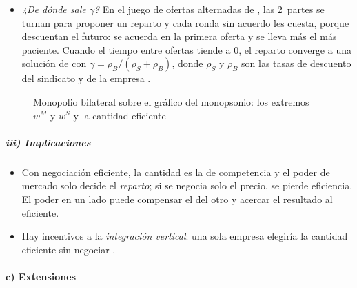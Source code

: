 \documentclass[11pt]{article}
\begin{document}
\begin{itemize}
\begin{equation}
  \end{equation}
  La cantidad es la eficiente y \emph{no depende} de $\gamma$; el salario reparte el excedente: cada parte recibe lo que tendría sin acuerdo más su cuota del excedente neto.
\item \emph{¿De dónde sale $\gamma$?} En el juego de ofertas alternadas de \textcite{Rubinstein1982Perfect}, las 2~partes se turnan para proponer un reparto y cada ronda sin acuerdo les cuesta, porque descuentan el futuro: se acuerda en la primera oferta y se lleva más el más paciente. Cuando el tiempo entre ofertas tiende a 0, el reparto converge a una solución de  con $\gamma=\rho_B/(\rho_S+\rho_B)$, donde $\rho_S$ y $\rho_B$ son las tasas de descuento del sindicato y de la empresa\nocite{BinmoreRubinsteinWolinsky1986Nash} .
\end{itemize}

\begin{figure}[H]
\centering
\caption{Monopolio bilateral sobre el gráfico del monopsonio: los extremos $w^M$ y $w^S$ y la cantidad eficiente}\label{fig:monopolio-bilateral}
\end{figure}

\subparagraph{iii) Implicaciones}

\begin{itemize}
\item Con negociación eficiente, la cantidad es la de competencia y el poder de mercado solo decide el \emph{reparto}; si se negocia solo el precio, se pierde eficiencia. El poder en un lado puede compensar el del otro y acercar el resultado al eficiente.
\item Hay incentivos a la \emph{integración vertical}: una sola empresa elegiría la cantidad eficiente sin negociar .
\end{itemize}

\paragraph{c) Extensiones}
\end{document}
